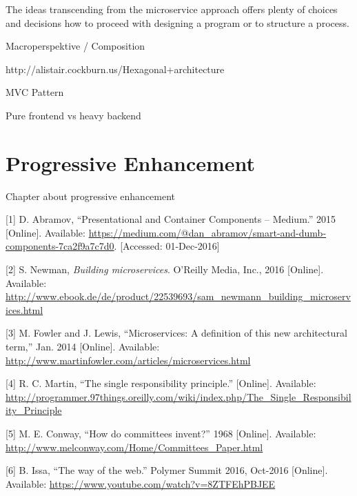 \documentclass[]{assets/latex/ieee}
\begin{document}
The ideas transcending from the microservice approach offers plenty of
choices and decisions how to proceed with designing a program or to
structure a process.

Macroperspektive / Composition

http://alistair.cockburn.us/Hexagonal+architecture

MVC Pattern

Pure frontend vs heavy backend

\section{Progressive Enhancement}\label{progressive-enhancement}

Chapter about progressive enhancement

\hypertarget{refs}{}
\hypertarget{ref-Abramov2015}{}
{[}1{]} D. Abramov, ``Presentational and Container Components --
Medium.'' 2015 {[}Online{]}. Available:
\url{https://medium.com/@dan_abramov/smart-and-dumb-components-7ca2f9a7c7d0}.
{[}Accessed: 01-Dec-2016{]}

\hypertarget{ref-Newman2015}{}
{[}2{]} S. Newman, \emph{Building microservices}. O'Reilly Media, Inc.,
2016 {[}Online{]}. Available:
\url{http://www.ebook.de/de/product/22539693/sam_newmann_building_microservices.html}

\hypertarget{ref-Fowler2014}{}
{[}3{]} M. Fowler and J. Lewis, ``Microservices: A definition of this
new architectural term,'' Jan. 2014 {[}Online{]}. Available:
\url{http://www.martinfowler.com/articles/microservices.html}

\hypertarget{ref-Martin}{}
{[}4{]} R. C. Martin, ``The single responsibility principle.''
{[}Online{]}. Available:
\url{http://programmer.97things.oreilly.com/wiki/index.php/The_Single_Responsibility_Principle}

\hypertarget{ref-Conway1968}{}
{[}5{]} M. E. Conway, ``How do committees invent?'' 1968 {[}Online{]}.
Available: \url{http://www.melconway.com/Home/Committees_Paper.html}

\hypertarget{ref-Issa2016}{}
{[}6{]} B. Issa, ``The way of the web.'' Polymer Summit 2016, Oct-2016
{[}Online{]}. Available:
\url{https://www.youtube.com/watch?v=8ZTFEhPBJEE}
\end{document}

